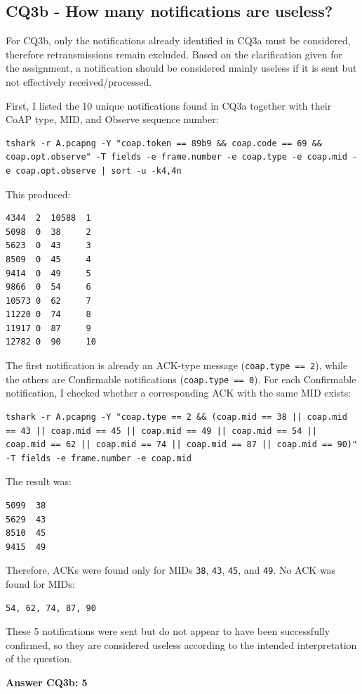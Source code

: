 \noindent
\begin{minipage}{\linewidth}
\subsection*{CQ3b - How many notifications are useless?}

For CQ3b, only the notifications already identified in CQ3a must be considered, therefore retransmissions remain excluded.  
Based on the clarification given for the assignment, a notification should be considered mainly useless if it is sent but not effectively received/processed.

First, I listed the 10 unique notifications found in CQ3a together with their CoAP type, MID, and Observe sequence number:

\begin{lstlisting}
tshark -r A.pcapng -Y "coap.token == 89b9 && coap.code == 69 && coap.opt.observe" -T fields -e frame.number -e coap.type -e coap.mid -e coap.opt.observe | sort -u -k4,4n
\end{lstlisting}

This produced:

\begin{verbatim}
4344  2  10588  1
5098  0  38     2
5623  0  43     3
8509  0  45     4
9414  0  49     5
9866  0  54     6
10573 0  62     7
11220 0  74     8
11917 0  87     9
12782 0  90     10
\end{verbatim}

The first notification is already an ACK-type message (\texttt{coap.type == 2}), while the others are Confirmable notifications (\texttt{coap.type == 0}).  
For each Confirmable notification, I checked whether a corresponding ACK with the same MID exists:

\begin{lstlisting}
tshark -r A.pcapng -Y "coap.type == 2 && (coap.mid == 38 || coap.mid == 43 || coap.mid == 45 || coap.mid == 49 || coap.mid == 54 || coap.mid == 62 || coap.mid == 74 || coap.mid == 87 || coap.mid == 90)" -T fields -e frame.number -e coap.mid
\end{lstlisting}

The result was:

\begin{verbatim}
5099  38
5629  43
8510  45
9415  49
\end{verbatim}

Therefore, ACKs were found only for MIDs \texttt{38}, \texttt{43}, \texttt{45}, and \texttt{49}.  
No ACK was found for MIDs:

\begin{verbatim}
54, 62, 74, 87, 90
\end{verbatim}

These 5 notifications were sent but do not appear to have been successfully confirmed, so they are considered useless according to the intended interpretation of the question.

\vspace{0.4cm}
\textbf{\huge Answer CQ3b: 5}
\end{minipage}